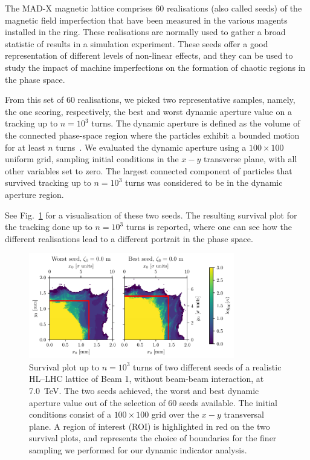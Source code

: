 The MAD-X magnetic lattice comprises 60 realisations (also called seeds) of the magnetic field imperfection that have been measured in the various magents installed in the ring. These realisations are normally used to gather a broad statistic of results in a simulation experiment. These seeds offer a good representation of different levels of non-linear effects, and they can be used to study the impact of machine imperfections on the formation of chaotic regions in the phase space.

From this set of 60 realisations, we picked two representative samples, namely, the one scoring, respectively, the best and worst dynamic aperture value on a tracking up to $n=10^3$ turns. The dynamic aperture is defined as the volume of the connected phase-space region where the particles exhibit a bounded motion for at least $n$ turns~\cite{DAdef, invlog}. We evaluated the dynamic aperture using a $100\times100$ uniform grid, sampling initial conditions in the $x-y$ transverse plane, with all other variables set to zero. The largest connected component of particles that survived tracking up to $n=10^3$ turns was considered to be in the dynamic aperture region.

See Fig.~\ref{fig:seed_presentation} for a visualisation of these two seeds. The resulting survival plot for the tracking done up to $n=10^3$ turns is reported, where one can see how the different realisations lead to a different portrait in the phase space.

\begin{figure}[htp]
    \centering
    \includegraphics[width=0.8\textwidth]{6_lhc_dynamic_indicators/figs/quick_scan.pdf}
    \caption{Survival plot up to $n=10^3$ turns of two different seeds of a realistic HL--LHC lattice of Beam 1, without beam-beam interaction, at \SI{7.0}{TeV}. The two seeds achieved, the worst and best dynamic aperture value out of the selection of 60 seeds available. The initial conditions consist of a $100\times100$ grid over the $x-y$ transversal plane. A region of interest (ROI) is highlighted in red on the two survival plots, and represents the choice of boundaries for the finer sampling we performed for our dynamic indicator analysis.}
    \label{fig:seed_presentation}
\end{figure}

